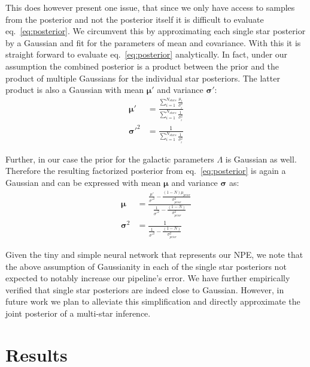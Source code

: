 \documentclass{aa}
\begin{document}
This does however present one issue, that since we only have access to samples from the posterior and not the posterior itself it is difficult to evaluate eq.~\ref{eq:posterior}. We circumvent this by approximating each single star posterior by a Gaussian and fit for the parameters of mean and covariance. With this it is straight forward to evaluate eq.~\ref{eq:posterior} analytically. In fact, under our assumption the combined posterior is a product between the prior and the product of multiple Gaussians for the individual star posteriors. The latter product is also a Gaussian with mean $\mathbf{\mu'}$ and variance $\mathbf{\sigma'}$:
\begin{align}
    \mathbf{\mu'} &= \frac{\sum_{i=1}^{N_{stars}} \frac{\mu_i}{\sigma_i^2}}{\sum_{i=1}^{N_{stars}} \frac1{\sigma_i^2}} \\
\mathbf{\sigma'}^2 &= \frac1 {\sum_{i=1}^{N_{stars}} \frac1{\sigma_i^2}}
\end{align}

Further, in our case the prior for the galactic parameters $\Lambda$ is Gaussian as well. Therefore the resulting factorized posterior from eq.~\ref{eq:posterior} is again a Gaussian and can be expressed with mean $\mathbf{\mu}$ and variance $\mathbf{\sigma}$ as:
\begin{align}
\mathbf{\mu} &= \frac{\frac{\mu'}{\sigma'^2}-\frac{(1-N)\mu_ {prior}}{\sigma_ {prior}^2}}{\frac1{\sigma'^2}-\frac{(1-N)}{\sigma_ {prior}^2}} \\
\mathbf{\sigma}^2 &= \frac1 {\frac1{\sigma'^2}-\frac{(1-N)}{\sigma_ {prior}^2}}
\end{align}

Given the tiny and simple neural network that represents our NPE, we note that the above assumption of Gaussianity in each of the single star posteriors not expected to notably increase our pipeline's error. We have further empirically verified that single star posteriors are indeed close to Gaussian.
However, in future work we plan to alleviate this simplification and directly approximate the joint posterior of a multi-star inference.


\section{Results}
\label{sec: Results}
\end{document}
